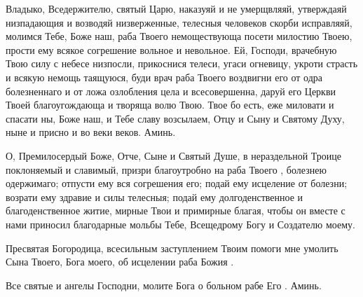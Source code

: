 \mychapterending

\begin{mymulticols}

Владыко, Вседержителю, святый Царю, наказуяй и не умерщвляяй, утверждаяй низпадающия и возводяй низверженные, телесныя человеков скорби исправляяй, молимся Тебе, Боже наш, раба Твоего  немоществующа посети милостию Твоею, прости ему всякое согрешение вольное и невольное. Ей, Господи, врачебную Твою силу с небесе низпосли, прикоснися телеси, угаси огневицу, укроти страсть и всякую немощь таящуюся, буди врач раба Твоего  воздвигни его от одра болезненнаго и от ложа озлобления цела и всесовершенна, даруй его Церкви Твоей благоугождающа и творяща волю Твою. Твое бо есть, еже миловати и спасати ны, Боже наш, и Тебе славу возсылаем, Отцу и Сыну и Святому Духу, ныне и присно и во веки веков. Аминь.

\end{mymulticols}

\mychapterending

\begin{mymulticols}

О, Премилосердый Боже, Отче, Сыне и Святый Душе, в нераздельной Троице поклоняемый и славимый, призри благоутробно на раба Твоего , болезнею одержимаго; отпусти ему вся согрешения его; подай ему исцеление от болезни; возрати ему здравие и силы телесныя; подай ему долгоденственное и благоденственное житие, мирные Твои и примирные благая, чтобы он вместе с нами приносил благодарные мольбы Тебе, Всещедрому Богу и Создателю моему. 

Пресвятая Богородица, всесильным заступлением Твоим помоги мне умолить Сына Твоего, Бога моего, об исцелении раба Божия . 

Все святые и ангелы Господни, молите Бога о больном рабе Его . Аминь.

\end{mymulticols}

\mychapterending

